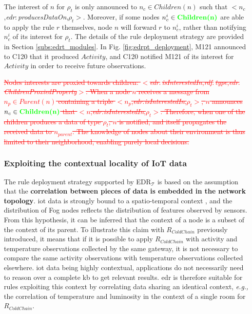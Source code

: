 \documentclass{iosart2c}
\newcommand{\edrt}{EDR$_{\mathcal{T}}$\xspace}
\newcommand{\added}[1]{\textcolor{green}{\textbf{#1}}}
\newcommand{\removed}[1]{\textcolor{red}{\sout{#1}}}
\newcommand{\namespace}[1]{\textit{#1$:$}}
\newcommand{\concept}[2]{\namespace{#1}\-\textit{#2}}
\newcommand{\triplet}[3]{$<$#1,\textit{#2},#3$>$}
\begin{document}
The interest of $n$ for $\rho_t$ is only announced to $n_c\in Children(n)$ such that \triplet{$n_c$}{\concept{edr}{produces\-Data\-On}}{$\rho_t$}.
Moreover, if some nodes $n^i_{c}\in \added{Children(n)}$ are able to apply the rule $r$ themselves, node $n$ will forward $r$ to $n^i_{c}$, rather than notifying $n^i_{c}$ of its interest for $\rho_t$.
The details of the rule deployment strategy are provided in Section \textsection \ref{subs:edrt_modules}.
In Fig. \ref{fig:edrpt_deployment}, M121 announced to C120 that it produced $Activity$, and C120 notified M121 of its interest for $Activity$ in order to receive future observations.

\removed{
Nodes interests are proxied towards children: \triplet{\concept{edr}{is\-Interested\-In}}{\concept{rdf}{type}}{\concept{edr}{Children\-Proxied\-Property}}.
When a node $n$ receives a message from $n_{p}\in Parent(n)$ containing a triple \triplet{$n_{p}$}{edr:is\-Interested\-In}{$\rho_t$}, $n$ announces $n_{c}\in \added{Children(n)}$ that \triplet{$n$}{edr:is\-Interested\-In}{$\rho_t$}.
Therefore, when one of the children produces a data of type $\rho_t$, $n$ is notified, and itself propagates the received data to $n_{parent}$.
The knowledge of nodes about their environment is thus limited to their neighborhood, enabling purely local decisions.}

\subsubsection{Exploiting the contextual locality of IoT data}
\label{subsubs:topology_rules}

The rule deployment strategy supported by \edrt is based on the assumption that the \textbf{correlation between pieces of data is embedded in the network topology}. 
\gls{iot} data is strongly bound to a spatio-temporal context \cite{Perera2014_context}, and the distribution of Fog nodes reflects the distribution of features observed by sensors.
From this hypothesis, it can be inferred that the context of a node is a subset of the context of its parent.
To illustrate this claim with $R_{ColdChain}$ previously introduced, it means that if it is possible to apply $R_{ColdChain}$ with activity and temperature observations collected by the same gateway, it is not necessary to compare the same activity observations with temperature observations collected elsewhere.
\gls{iot} data being highly contextual, applications do not necessarily need to reason over a complete \gls{kb} to get relevant results.
\gls{edr} is therefore suitable for rules exploiting this context by correlating data sharing an identical context, \textit{e.g.,} the correlation of temperature and luminosity in the context of a single room for $R_{ColdChain}$.
\end{document}
